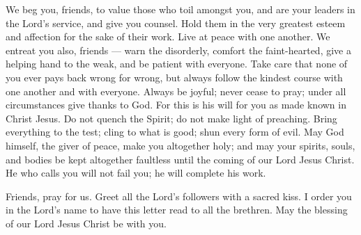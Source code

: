  We beg you, friends, to value those who toil amongst you,
and are your leaders in the Lord's service, and give you counsel.
 Hold them in the very greatest esteem and affection for
the sake of their work. Live at peace with one another.  We
entreat you also, friends --- warn the disorderly, comfort the
faint-hearted, give a helping hand to the weak, and be patient with
everyone.  Take care that none of you ever pays back wrong
for wrong, but always follow the kindest course with one another and
with everyone.  Always be joyful;  never cease
to pray;  under all circumstances give thanks to God. For
this is his will for you as made known in Christ Jesus.  Do
not quench the Spirit;  do not make light of preaching.
 Bring everything to the test; cling to what is good;
 shun every form of evil.  May God himself,
the giver of peace, make you altogether holy; and may your spirits,
souls, and bodies be kept altogether faultless until the coming of our
Lord Jesus Christ.  He who calls you will not fail you; he
will complete his work.

 Friends, pray for us.  Greet all the Lord's
followers with a sacred kiss.  I order you in the Lord's
name to have this letter read to all the brethren.  May the
blessing of our Lord Jesus Christ be with you.
